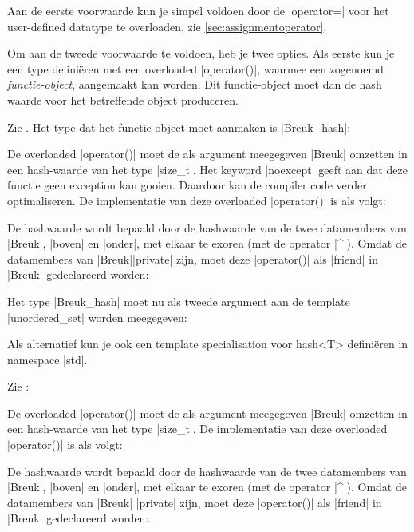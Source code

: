 \begin{cpplstShortInline}
Aan de eerste voorwaarde kun je simpel voldoen door de |operator=| voor het user-defined datatype te overloaden, zie \cref{sec:assignmentoperator}.

Om aan de tweede voorwaarde te voldoen, heb je twee opties.
Als eerste kun je een type definiëren met een overloaded |operator()|, waarmee een zogenoemd \emph{functie-object}, aangemaakt kan worden.
Dit functie-object moet dan de hash waarde voor het betreffende object produceren.
 
Zie .
Het type dat het functie-object moet aanmaken is |Breuk_hash|:


De overloaded |operator()| moet de als argument meegegeven |Breuk| omzetten in een hash-waarde van het type |size_t|.
Het keyword |noexcept| geeft aan dat deze functie geen exception kan gooien.
Daardoor kan de compiler code verder optimaliseren.
De implementatie van deze overloaded |operator()| is als volgt:


De hashwaarde wordt bepaald door de hashwaarde van de twee datamembers van |Breuk|, |boven| en |onder|, met elkaar te exoren (met de operator |^|).
Omdat de datamembers van |Breuk||private| zijn, moet deze |operator()| als |friend| in |Breuk| gedeclareerd worden:


Het type |Breuk_hash| moet nu als tweede argument aan de template |unordered_set| worden meegegeven:


Als alternatief kun je ook een template specialisation voor hash<T> definiëren in namespace |std|.

Zie :


De overloaded |operator()| moet de als argument meegegeven |Breuk| omzetten in een hash-waarde van het type |size_t|.
De implementatie van deze overloaded |operator()| is als volgt:


De hashwaarde wordt bepaald door de hashwaarde van de twee datamembers van |Breuk|, |boven| en |onder|, met elkaar te exoren (met de operator |^|).
Omdat de datamembers van |Breuk| |private| zijn, moet deze |operator()| als |friend| in |Breuk| gedeclareerd worden:


\end{cpplstShortInline}
